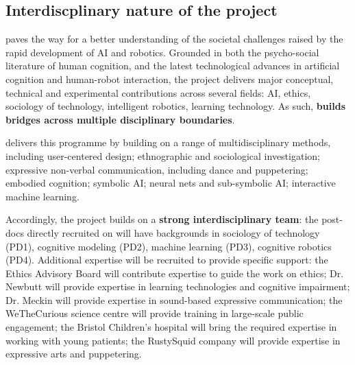 \subsection{Interdiscplinary nature of the project}

\begin{rewrite}


\project paves the way for a better understanding of the societal challenges
raised by the rapid development of AI and robotics. Grounded in both the
psycho-social literature of human cognition, and the latest technological
advances in artificial cognition and human-robot interaction, the project
delivers major conceptual, technical and experimental contributions across
several fields: AI, ethics, sociology of technology, intelligent robotics,
learning technology. As such, \textbf{\project builds bridges across
multiple disciplinary boundaries}.

\project delivers this programme by building on a range of multidisciplinary
methods, including user-centered design; ethnographic and sociological
investigation; expressive non-verbal communication, including dance and
puppetering; embodied cognition; symbolic AI; neural
nets and sub-symbolic AI; interactive machine learning.

Accordingly, the project builds on a \textbf{strong interdisciplinary team}: the
post-docs directly recruited on \project will have backgrounds in sociology of
technology (PD1), cognitive modeling (PD2), machine learning (PD3), cognitive
robotics (PD4). Additional expertise will be recruited to provide specific
support: the \project Ethics Advisory Board will contribute expertise to guide
the work on ethics; Dr. Newbutt will provide expertise in learning technologies
and cognitive impairment; Dr. Meckin will provide expertise in sound-based
expressive communication; the WeTheCurious science centre will provide training
in large-scale public engagement; the Bristol Children's hospital will bring the
required expertise in working with young patients; the RustySquid company will
provide expertise in expressive arts and puppetering.

\end{rewrite}

\newpage
